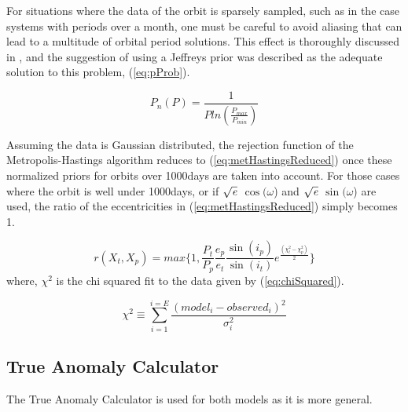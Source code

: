 \documentclass[12pt,preprint]{aastex}
\begin{document}
For situations where the data of the orbit is sparsely sampled, such as in the case systems with periods over a month, one must be careful to avoid aliasing that can lead to a multitude of orbital period solutions.  This effect is thoroughly discussed in \citet{gregory2005}, and the suggestion of using a Jeffreys prior was described as the adequate solution to this problem, (\ref{eq:pProb}).

\begin{equation}\label{eq:pProb}
P_n(P) =  \frac{1}{P ln(\frac{P_{max}}{P_{min}})}
\end{equation}

Assuming the data is Gaussian distributed, the rejection function of the Metropolis-Hastings algorithm reduces to (\ref{eq:metHastingsReduced}) once these normalized priors for orbits over 1000days are taken into account.  For those cases where the orbit is well under 1000days, or if $\sqrt{{\it e}}$ $\cos(\omega$) and $\sqrt{{\it e}}$ $\sin(\omega$) are used, the ratio of the eccentricities in (\ref{eq:metHastingsReduced}) simply becomes 1.

\begin{equation}\label{eq:metHastingsReduced}
r(X_t,X_p) = max\bigg\{1, \frac{P_t}{P_p}\frac{e_p}{e_t}\frac{\sin(i_p)}{\sin(i_t)}e^{\frac{(\chi^2_t - \chi^2_p)}{2}} \bigg\}
\end{equation}
where, $\chi^2$ is the chi squared fit to the data given by (\ref{eq:chiSquared}).

\begin{equation}\label{eq:chiSquared}
{\chi}^{2} \equiv  \sum_{i=1}^{i=E} \frac{(model_i - observed_i)^{2}}{\sigma^{2}_i}
\end{equation}


\pagebreak
\subsection{True Anomaly Calculator}
The True Anomaly Calculator is used for both models as it is more general.
\end{document}
